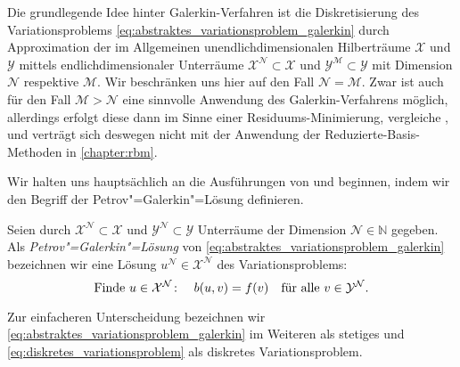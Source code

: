 \documentclass[../main.tex]{subfiles}
\begin{document}
Die grundlegende Idee hinter Galerkin-Verfahren ist die Diskretisierung des Variationsproblems \cref{eq:abstraktes_variationsproblem_galerkin} durch Approximation der im Allgemeinen unendlichdimensionalen Hilberträume $\mathcal X$ und $\mathcal Y$ mittels endlichdimensionaler Unterräume $\mathcal X^{\mathcal N} \subset \mathcal X$ und $\mathcal Y^{\mathcal M} \subset \mathcal Y$ mit Dimension $\mathcal N$ respektive $\mathcal M$.
Wir beschränken uns hier auf den Fall $\mathcal N = \mathcal M$.
Zwar ist auch für den Fall $\mathcal M > \mathcal N$ eine sinnvolle Anwendung des Galerkin-Verfahrens möglich, allerdings erfolgt diese dann im Sinne einer Residuums-Minimierung, vergleiche \cite{Andreev:2012ep}, und verträgt sich deswegen nicht mit der Anwendung der Reduzierte-Basis-Methoden in \cref{chapter:rbm}.

Wir halten uns hauptsächlich an die Ausführungen von \textcite[Section 3.1]{Nochetto:2009il} und beginnen, indem wir den Begriff der Petrov"=Galerkin"=Lösung definieren.

\begin{Definition}
    \label{definition:disrekte_loesung}
    Seien durch $\mathcal X^{\mathcal N} \subset \mathcal X$ und $\mathcal Y^{\mathcal N} \subset \mathcal Y$ Unterräume der Dimension $\mathcal N \in \mathbb{N}$ gegeben.
    Als \emph{Petrov"=Galerkin"=Lösung} von \cref{eq:abstraktes_variationsproblem_galerkin} bezeichnen wir eine Lösung $u^{\mathcal N} \in \mathcal X^{\mathcal N}$ des Variationsproblems:
    \begin{equation}
        \label{eq:diskretes_variationsproblem}
        \text{Finde}~u \in \mathcal X^{\mathcal N} \colon \quad  b(u, v) = f(v) \quad \fa v \in \mathcal Y^{\mathcal N}.
    \end{equation}
\end{Definition}

Zur einfacheren Unterscheidung bezeichnen wir \cref{eq:abstraktes_variationsproblem_galerkin} im Weiteren als stetiges und \cref{eq:diskretes_variationsproblem} als diskretes Variationsproblem.
\end{document}
